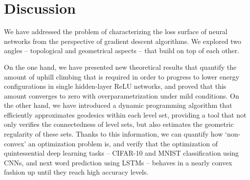 \section{Discussion}
\label{sec:Discussion}

We have addressed the problem of characterizing the loss surface of neural networks from the perspective
of gradient descent algorithms. We explored two angles -- topological and geometrical aspects -- that build on top of each other. 


On the one hand, we have presented new theoretical results that quantify 
the amount of uphill climbing that is required in order to progress to lower energy configurations in 
single hidden-layer ReLU networks, and proved that this amount converges to zero with overparametrization under mild conditions. On the other hand, we have introduced a dynamic programming algorithm that efficiently approximates geodesics within each level set, providing a tool that not only verifies the connectedness of level sets, but also estimates the geometric regularity of these sets. Thanks to this information, we can quantify how `non-convex' an optimization problem is, and verify that the optimization of quintessential deep learning tasks -- CIFAR-10 and MNIST classification using CNNs, and next word prediction using LSTMs -- behaves in a nearly convex fashion up until they reach high accuracy levels.

